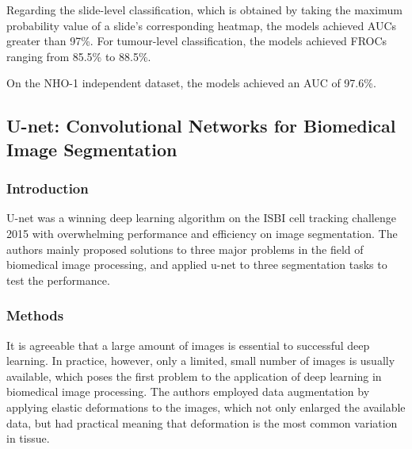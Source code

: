 \documentclass{article}
\begin{document}
Regarding the slide-level classification, which is obtained by taking the maximum probability value of a slide’s corresponding heatmap, the models achieved AUCs greater than 97\%. For tumour-level classification, the models achieved FROCs ranging from 85.5\% to 88.5\%.

On the NHO-1 independent dataset, the models achieved an AUC of 97.6\%.

\subsection{U-net: Convolutional Networks for Biomedical Image Segmentation \cite{Ronneberger2015UNetCN}}

\subsubsection{Introduction}
U-net was a winning deep learning algorithm on the ISBI cell tracking challenge 2015 with overwhelming performance and efficiency on image segmentation. The authors mainly proposed solutions to three major problems in the field of biomedical image processing, and applied u-net to three segmentation tasks to test the performance.

\subsubsection{Methods}
It is agreeable that a large amount of images is essential to successful deep learning. In practice, however, only a limited, small number of images is usually available, which poses the first problem to the application of deep learning in biomedical image processing. The authors employed data augmentation by applying elastic deformations to the images, which not only enlarged the available data, but had practical meaning that deformation is the most common variation in tissue.
\end{document}
